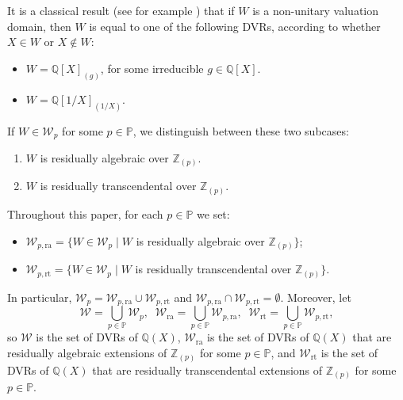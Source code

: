 \documentclass[10pt]{article}
\numberwithin{equation}{section}
\theoremstyle{definition}
\theoremstyle{definition}
\newcommand{\Q}{\mathbb{Q}}
\newcommand{\Z}{\mathbb{Z}}
\newcommand{\PP}{\mathbb{P}}
\newcommand{\ra}{\text{ra}}
\newcommand{\rt}{\text{rt}}
\begin{document}
It is a classical result (see for example \cite[p. 3]{Chevalley}) that if $W$ is a non-unitary valuation domain,
then $W$ is equal to one of the following DVRs, according to whether $X\in W$ or $X\not\in W$:
\begin{itemize}
\item[-] $W=\Q[X]_{(g)}$, for some irreducible $g\in\Q[X]$.
\item[-] $W=\Q[1/X]_{(1/X)}.$
\end{itemize}

\noindent
If $W\in \mathcal{W}_p$ for some $p\in\PP$, 
we distinguish between these two subcases:
\begin{enumerate}
\item $W$ is residually algebraic over $\Z_{(p)}$.
\item $W$ is residually transcendental over $\Z_{(p)}$.
\end{enumerate}

\noindent
Throughout this paper, for each $p\in\PP$ we set:
\begin{itemize}
    \item[-] $\mathcal{W}_{p,\ra} = \{W \in \mathcal{W}_p \mid W$ is residually algebraic over $\Z_{(p)}\}$;
    \item[-] $\mathcal{W}_{p,\rt} = \{W \in \mathcal{W}_p \mid W$ is residually transcendental over $\Z_{(p)}\}$.
\end{itemize}
In particular, $\mathcal{W}_{p} = \mathcal{W}_{p,\ra} \cup \mathcal{W}_{p,\rt}$ and  $\mathcal{W}_{p,\ra} \cap \mathcal{W}_{p,\rt}= \emptyset$.
Moreover, let 
$$\mathcal{W} = \bigcup\limits_{p \in \PP}\mathcal{W}_p,\;\; \mathcal{W}_{\ra} = \bigcup\limits_{p \in \PP}\mathcal{W}_{p,\ra},\;\;\mathcal{W}_{\rt} = \bigcup\limits_{p \in \PP}\mathcal{W}_{p,\rt},$$
so
$\mathcal{W}$ is the set of DVRs of $\Q(X)$,
$\mathcal{W}_{\ra}$ is the set of DVRs of $\Q(X)$ that are residually algebraic extensions of $\Z_{(p)}$ for some $p\in\PP$, and
 $\mathcal{W}_{\rt}$ is the set of DVRs of $\Q(X)$ that are residually transcendental extensions of $\Z_{(p)}$ for some $p\in\PP$.
\end{document}
